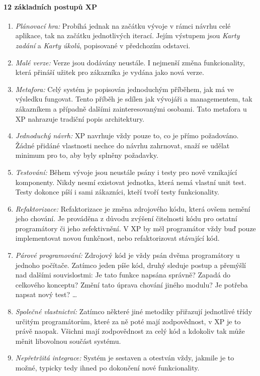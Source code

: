 \paragraph{12 základních postupů XP} \label{methods:XP:12}
\begin{enumerate}
	\item \emph{Plánovací hra:} Probíhá jednak na začátku vývoje v rámci návrhu celé aplikace, tak na začátku jednotlivých iterací. Jejím výstupem jsou \emph{Karty zadání} a \emph{Karty úkolů}, popisované v předchozím odstavci.
	\item \emph{Malé verze:} Verze jsou dodávány neustále. I nejmenší změna funkcionality, která přináší užitek pro zákazníka je vydána jako nová verze.
	\item \emph{Metafora:} Celý systém je popisován jednoduchým příběhem, jak má ve výsledku fungovat. Tento příběh je sdílen jak vývojáři a managementem, tak zákazníkem a případně dalšími zainteresovanými osobami. Tato metafora u XP nahrazuje tradiční popis architektury.
	\item \emph{Jednoduchý návrh:} XP navrhuje vždy pouze to, co je přímo požadováno. Žádné přidáné vlastnosti nechce do návrhu zahrnovat, snaží se udělat minimum pro to, aby byly splněny požadavky.
	\item \emph{Testování:} Během vývoje jsou neustále psány i testy pro nově vznikající komponenty. Nikdy nesmí existovat jednotka, která nemá vlastní unit test. Testy dokonce píší i sami zákazníci, kteří tvoří testy funkcionality.
	\item \emph{Refaktorizace:} Refaktorizace je změna zdrojového kódu, která ovšem nemění jeho chování. Je prováděna z důvodu zvýšení čitelnosti kódu pro ostatní programátory či jeho zefektivnění. V XP by měl programátor vždy buď pouze implementovat novou funkčnost, nebo refaktorizovat stávající kód.
	\item \emph{Párové programování:} Zdrojový kód je vždy psán dvěma programátory u jednoho počítače. Zatímco jeden píše kód, druhý sleduje postup a přemýšlí nad dalšími souvislostmi: Je tato funkce napsána správně? Zapadá do celkového konceptu? Změní tato úprava chování jiného modulu? Je potřeba napsat nový test? \ldots
	\item \emph{Společné vlastnictví:} Zatímco některé jiné metodiky přiřazují jednotlivé třídy určitým programátorům, které za ně poté mají zodpovědnost, v XP je to právě naopak. Všichni mají zodpovědnost za celý kód a kdokoliv tak může měnit libovolnou součást systému.
	\item \emph{Nepřetržitá integrace:} Systém je sestaven a otestván vždy, jakmile je to možné, typicky tedy ihned po dokončení nové funkcionality.

\end{enumerate}
